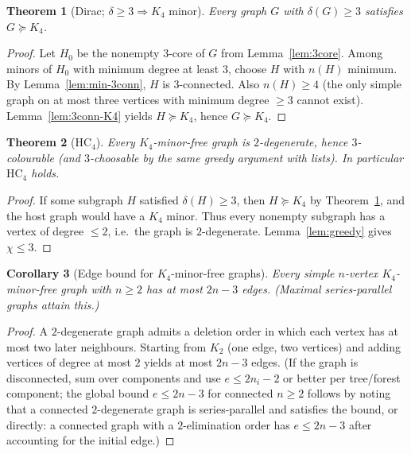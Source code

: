 \documentclass[11pt]{article}
\newtheorem{theorem}{Theorem}[section]
\newtheorem{corollary}[theorem]{Corollary}
\theoremstyle{definition}
\begin{document}
\begin{theorem}[Dirac; \(\delta\ge 3\Rightarrow K_4\) minor]\label{thm:dirac-K4}
Every graph \(G\) with \(\delta(G)\ge 3\) satisfies \(G\succcurlyeq K_4\).
\end{theorem}

\begin{proof}
Let \(H_0\) be the nonempty \(3\)-core of \(G\) from Lemma~\ref{lem:3core}. Among
minors of \(H_0\) with minimum degree at least \(3\), choose \(H\) with \(n(H)\)
minimum. By Lemma~\ref{lem:min-3conn}, \(H\) is \(3\)-connected. Also
\(n(H)\ge 4\) (the only simple graph on at most three vertices with minimum
degree \(\ge 3\) cannot exist). Lemma~\ref{lem:3conn-K4} yields
\(H\succcurlyeq K_4\), hence \(G\succcurlyeq K_4\).
\end{proof}

\begin{theorem}[\(\mathrm{HC}_4\)]\label{thm:hc4}
Every \(K_4\)-minor-free graph is \(2\)-degenerate, hence \(3\)-colourable (and
\(3\)-choosable by the same greedy argument with lists). In particular
\(\mathrm{HC}_4\) holds.
\end{theorem}

\begin{proof}
If some subgraph \(H\) satisfied \(\delta(H)\ge 3\), then \(H\succcurlyeq K_4\) by
Theorem~\ref{thm:dirac-K4}, and the host graph would have a \(K_4\) minor. Thus
every nonempty subgraph has a vertex of degree \(\le 2\), i.e.\ the graph is
\(2\)-degenerate. Lemma~\ref{lem:greedy} gives \(\chi\le 3\).
\end{proof}

\begin{corollary}[Edge bound for \(K_4\)-minor-free graphs]\label{cor:K4-edges}
Every simple \(n\)-vertex \(K_4\)-minor-free graph with \(n\ge 2\) has at most
\(2n-3\) edges. (Maximal series-parallel graphs attain this.)
\end{corollary}

\begin{proof}
A \(2\)-degenerate graph admits a deletion order in which each vertex has at
most two later neighbours. Starting from \(K_2\) (one edge, two vertices) and
adding vertices of degree at most \(2\) yields at most \(2n-3\) edges. (If the
graph is disconnected, sum over components and use \(e\le 2n_i-2\) or better per
tree/forest component; the global bound \(e\le 2n-3\) for connected \(n\ge 2\)
follows by noting that a connected \(2\)-degenerate graph is series-parallel and
satisfies the bound, or directly: a connected graph with a \(2\)-elimination
order has \(e\le 2n-3\) after accounting for the initial edge.)
\end{proof}
\end{document}
